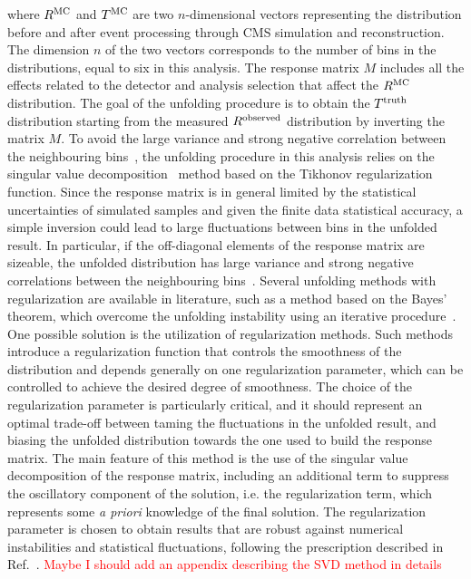 where $R^{\rm{MC}}$ and $T^{\rm{MC}}$ are two $n$-dimensional vectors
representing the distribution before and after event processing through CMS
simulation and reconstruction. The dimension $n$ of the two vectors corresponds 
to the number of bins in the distributions, equal to six in this analysis.
The response matrix $M$ includes all the effects related to the detector and analysis selection that affect the $R^{\rm{MC}}$ distribution.
The goal of the unfolding procedure is to obtain the $T^{\rm{truth}}$ distribution starting from the measured
$R^{\rm{observed}}$ distribution by inverting the matrix $M$.
To avoid the large variance and strong negative correlation between the neighbouring bins~\cite{Cowan:2002in}, the unfolding procedure in this analysis relies on the singular value decomposition~\cite{Hocker:1995kb} method based on the Tikhonov regularization
function.
Since the response matrix is in general limited by the statistical uncertainties of simulated samples and given the finite data statistical accuracy, a simple inversion could lead to large fluctuations between bins in the unfolded result. In particular, if the off-diagonal elements
of the response matrix are sizeable, the unfolded distribution has large variance and 
strong negative correlations between the neighbouring bins~\cite{Cowan:2002in}.
Several unfolding methods with regularization are available in literature, such as a method based on the Bayes' theorem, which overcome 
the unfolding instability using an iterative procedure~\cite{DAgostini:1994zf}.
One possible solution is the utilization of regularization methods.
Such methods introduce a regularization function that controls the smoothness of the distribution 
and depends generally on one regularization parameter, which can be controlled
to achieve the desired degree of smoothness.
The choice of the regularization parameter is particularly critical, and it
should represent an optimal trade-off between taming the fluctuations in the
unfolded result, and biasing the unfolded distribution towards the one used to
build the response matrix. 
The main feature of this method is the use of the singular value decomposition of the response matrix, including an additional term to suppress the oscillatory component of the solution, i.e. the regularization term, which represents some \textit{a priori} knowledge of the final solution.
The regularization parameter is chosen to obtain results that are robust against numerical instabilities and statistical fluctuations, following the prescription described in Ref.~\cite{Hocker:1995kb}.
\textcolor{red}{Maybe I should add an appendix describing the SVD method in details}

